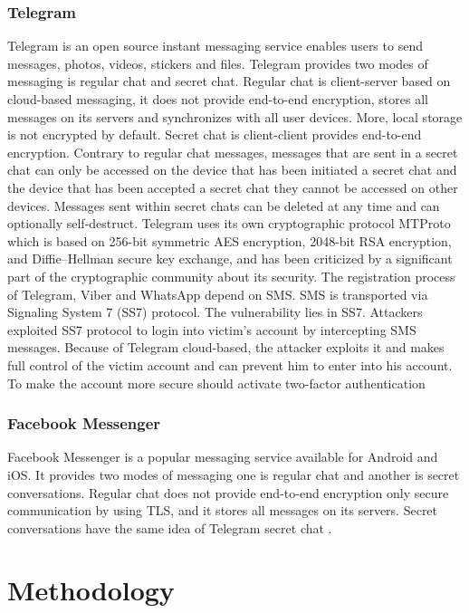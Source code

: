 \subsection{Telegram}
Telegram is an open source instant messaging service enables users to send messages, photos, videos, stickers and files. Telegram provides two modes of messaging
is regular chat and secret chat. Regular chat is client-server based on cloud-based messaging, it does not provide end-to-end encryption, stores all messages on its
servers and synchronizes with all user devices. More, local storage is not encrypted by default. Secret chat is client-client provides end-to-end encryption. Contrary to regular chat messages, messages that are sent in a secret chat can only be accessed on the device that has been initiated a secret chat and the device that has been accepted a secret chat they cannot be accessed on other devices. Messages sent within secret chats can be deleted
at any time and can optionally self-destruct. Telegram uses its own cryptographic protocol MTProto which is based on 256-bit symmetric AES encryption, 2048-bit RSA encryption, and Diffie–Hellman secure key exchange, and has been criticized by a significant part of the cryptographic community about its security. The registration process of Telegram, Viber and WhatsApp depend on SMS. SMS is transported via Signaling System 7 (SS7) protocol. The vulnerability lies in SS7. Attackers exploited SS7 protocol to login into
victim's account by intercepting SMS messages. Because of Telegram cloud-based, the attacker exploits it and makes full control of the victim account and can prevent him to enter into his account. To make the account more secure should activate two-factor authentication \cite{de}

\subsection{Facebook Messenger}
Facebook Messenger is a popular messaging service
available for Android and iOS. It provides two modes of
messaging one is regular chat and another is secret conversations.
Regular chat does not provide end-to-end encryption only
secure communication by using TLS,  and it stores all
messages on its servers. Secret conversations have  the
same idea of Telegram secret chat .




\chapter{Methodology}

